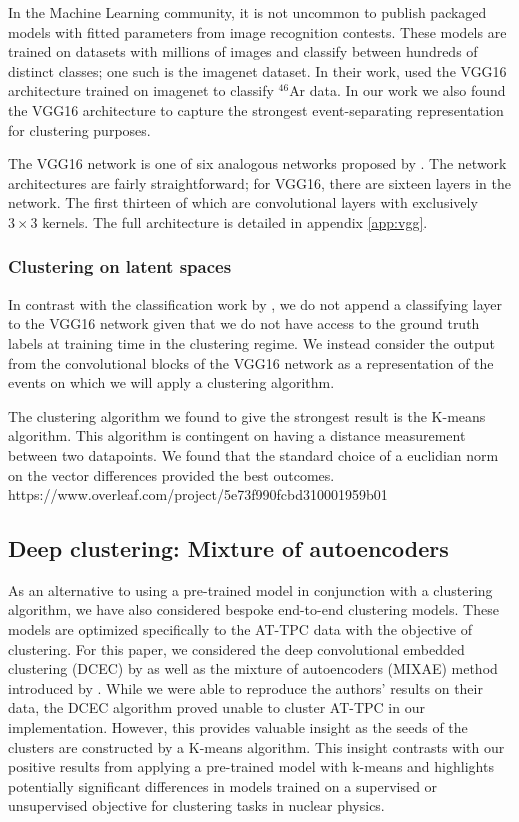 \documentclass[preprint,12pt]{elsarticle}
\begin{document}
In the Machine Learning community, it is not uncommon to publish packaged models with fitted parameters from image recognition contests. These models are trained on datasets with millions of images and classify between hundreds of distinct classes; one such is the imagenet dataset. In their work, \citet{Kuchera2019} used the VGG16 architecture trained on imagenet to classify ${}^{46}$Ar data. In our work we also found the VGG16 architecture to capture the strongest event-separating representation for clustering purposes. 

The VGG16 network is one of six analogous networks proposed by \citet{Simonyan2014}. The network architectures are fairly straightforward; for VGG16, there are sixteen layers in the network. The first thirteen of which are convolutional layers with exclusively $3 \times 3$ kernels.  The full architecture is detailed in appendix \ref{app:vgg}.

\subsubsection{Clustering on latent spaces}

In contrast with the classification work by \citet{Kuchera2019}, we do not append a classifying layer to the VGG16 network given that we do not have access to the ground truth labels at training time in the clustering regime. We instead consider the output from the convolutional blocks of the VGG16 network as a representation of the events on which we will apply a clustering algorithm. 

The clustering algorithm we found to give the strongest result is the K-means algorithm. This algorithm is contingent on having a distance measurement between two datapoints. We found that the standard choice of a euclidian norm on the vector differences provided the best outcomes.
https://www.overleaf.com/project/5e73f990fcbd310001959b01


\subsection{Deep clustering: Mixture of autoencoders}\label{sec:mixae}

As an alternative to using a pre-trained model in conjunction with a clustering algorithm, we have also considered bespoke end-to-end clustering models. These models are optimized specifically to the AT-TPC data with the objective of clustering. For this paper, we considered the deep convolutional embedded clustering (DCEC) by \citet{Guo2017} as well as the mixture of autoencoders (MIXAE) method introduced by \citet{Zhang}. While we were able to reproduce the authors' results on their data, the DCEC algorithm proved unable to cluster AT-TPC in our implementation. However, this provides valuable insight as the seeds of the clusters are constructed by a K-means algorithm. This insight contrasts with our positive results from applying a pre-trained model with k-means and highlights potentially significant differences in models trained on a supervised or unsupervised objective for clustering tasks in nuclear physics. 
\end{document}
